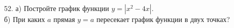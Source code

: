 52. а) Постройте график функции $y=|x^2-4x|.$\\
б) При каких $a$ прямая $y=a$ пересекает график функции в двух точках?\\

